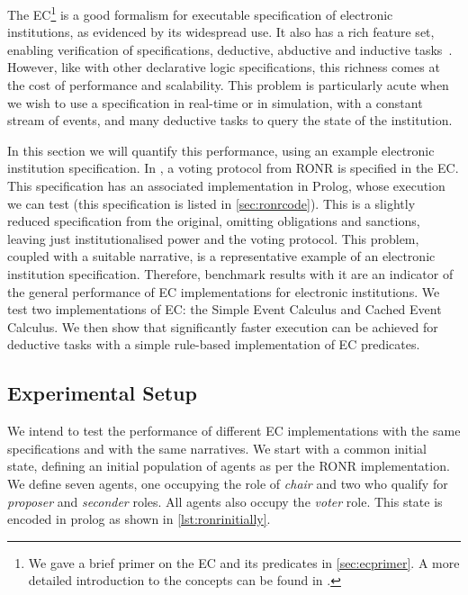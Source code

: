 The \acl{EC}\footnote{We gave a brief primer on the \ac{EC} and its predicates in \autoref{sec:ecprimer}. A more detailed introduction to the concepts can be found in \citet{Shanahan1999}.} is a good formalism for executable specification of electronic
institutions, as evidenced by its widespread use. It also has a rich feature
set, enabling verification of specifications, deductive, abductive and
inductive tasks~\citep{Shanahan1999}. However, like with other declarative
logic specifications, this richness comes at the cost of performance and
scalability. This problem is particularly acute when we wish to use a
specification in real-time or in simulation, with a constant stream of events,
and many deductive tasks to query the state of the institution.

In this section we will quantify this performance, using an example electronic
institution specification. In \citet{Pitt2005a}, a voting protocol from
\ac{RONR} is specified in the \ac{EC}. This specification has an associated
implementation in Prolog, whose execution we can test (this specification is
listed in \autoref{sec:ronrcode}). This is a slightly reduced specification
from the original, omitting obligations and sanctions, leaving just
institutionalised power and the voting protocol. This problem, coupled with a
suitable narrative, is a representative example of an electronic institution
specification. Therefore, benchmark results with it are an indicator of the
general performance of \ac{EC} implementations for electronic institutions. We
test two implementations of \ac{EC}: the Simple Event Calculus and Cached
Event Calculus. We then show that significantly faster execution can be
achieved for deductive tasks with a simple rule-based implementation of
\ac{EC} predicates.

\subsection{Experimental Setup}

We intend to test the performance of different \ac{EC} implementations
with the same specifications and with the same narratives. We start with a
common initial state, defining an initial population of agents as per the \ac{RONR} 
implementation. We define seven agents, one occupying the role of \emph{chair}
and two who qualify for \emph{proposer} and \emph{seconder} roles. All agents
also occupy the \emph{voter} role. This state is encoded in prolog as shown in
\autoref{lst:ronrinitially}.

